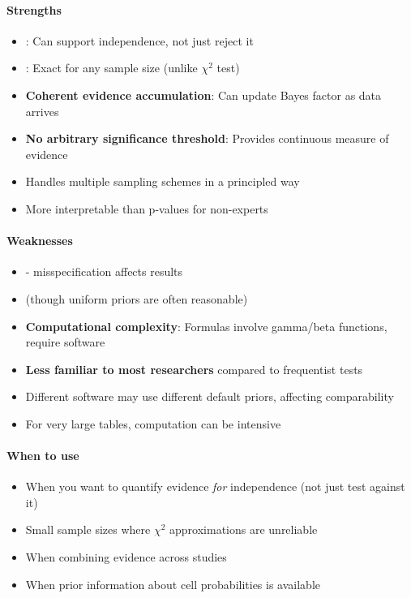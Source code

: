 \paragraph{Strengths}
\begin{itemize}
    \item {}: Can support independence, not just reject it
    \item {}: Exact for any sample size (unlike $\chi^2$ test)
    \item \textbf{Coherent evidence accumulation}: Can update Bayes factor as data arrives
    \item \textbf{No arbitrary significance threshold}: Provides continuous measure of evidence
    \item Handles multiple sampling schemes in a principled way
    \item More interpretable than p-values for non-experts
\end{itemize}

\paragraph{Weaknesses}
\begin{itemize}
    \item {} - misspecification affects results
    \item {} (though uniform priors are often reasonable)
    \item \textbf{Computational complexity}: Formulas involve gamma/beta functions, require software
    \item \textbf{Less familiar to most researchers} compared to frequentist tests
    \item Different software may use different default priors, affecting comparability
    \item For very large tables, computation can be intensive
\end{itemize}

\paragraph{When to use}
\begin{itemize}
    \item When you want to quantify evidence \emph{for} independence (not just test against it)
    \item Small sample sizes where $\chi^2$ approximations are unreliable
    \item When combining evidence across studies
    \item When prior information about cell probabilities is available
\end{itemize}

